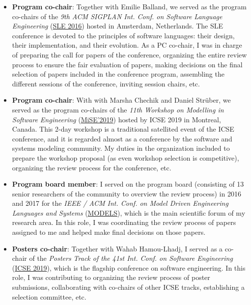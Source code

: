 \begin{itemize}[leftmargin=0.5cm]
\item \textbf{Program co-chair}: Together with Emilie Balland, we served as the program co-chairs of the \emph{9th ACM SIGPLAN Int. Conf. on Software Language Engineering} (\href{https://www.sleconf.org/2016/}{SLE 2016}) hosted in Amsterdam, Netherlands. The SLE conference is devoted to the principles of software languages: their design, their implementation, and their evolution. As a PC co-chair, I was in charge of preparing the call for papers of the conference, organizing the entire review process to ensure the fair evaluation of papers, making decisions on the final selection of papers included in the conference program, assembling the different sessions of the conference, inviting session chairs, etc. 

\item \textbf{Program co-chair}: With with Marsha Chechik and Daniel Strüber, we served as the program co-chairs of the \emph{11th Workshop on Modelling in Software Engineering} (\href{https://sselab.de/lab2/public/wiki/MiSE/index.php}{MiSE’2019}) hosted by ICSE 2019 in Montreal, Canada. This 2-day workshop is a traditional satellited event of the ICSE conference, and it is regarded almost as a conference by the software and systems modeling community. My duties in the organization included to prepare the workshop proposal (as even workshop selection is competitive), organizing the review process for the conference, etc.

\item \textbf{Program board member}: I served on the program board (consisting of 13 senior researchers of the community to overview the review process) in 2016 and 2017 for the \emph{IEEE / ACM Int. Conf. on Model Driven Engineering Languages and Systems} (\href{http://modelsconference.org/}{MODELS}), which is the main scientific forum of my research area. In this role, I was coordinating the review process of papers assigned to me and helped make final decisions on those papers.

\item \textbf{Posters co-chair}: Together with Wahab Hamou-Lhadj, I served as a co-chair of the \emph{Posters Track of the 41st Int. Conf. on Software Engineering} 
(\href{https://2019.icse-conferences.org/track/icse-2019-Posters}{ICSE 2019}), which is the flagship conference on software engineering. In this role, I was contributing to organizing the review process of poster submissions, collaborating with co-chairs of other ICSE tracks, establishing a selection committee, etc.


\end{itemize}
